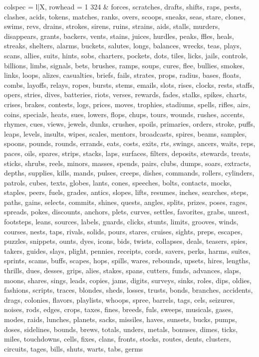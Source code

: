 \begin{tblr}[
  long,
  caption = {Examples from SNLI.},
  entry = {Short Caption},
  label = {tblr:test},
]{
colspec = {l|X},
rowhead = 1}
324 & forces, scratches, drafts, shifts, raps, pests, clashes, acids, tokens, matches, ranks, overs, scoops, sneaks, seas, stare, clones, swims, revs, drains, strokes, sirens, ruins, strains, aids, stalls, murders, disappears, grants, backers, vents, stains, juices, hurdles, peaks, ffles, heals, streaks, shelters, alarms, buckets, salutes, longs, balances, wrecks, teas, plays, scans, allies, suits, hints, sobs, charters, pockets, dots, tiles, licks, jails, controls, billions, limbs, signals, bets, brushes, ramps, soups, cures, flee, bullies, smokes, links, loops, alizes, casualties, briefs, fails, strates, props, radius, bases, floats, combs, layoffs, relays, ropes, bursts, stems, emails, slots, rises, clocks, rests, staffs, opers, stries, dives, batteries, riots, verses, rewards, fades, stalks, spikes, charts, crises, brakes, contests, logs, prices, moves, trophies, stadiums, spells, rifles, airs, coins, specials, heats, sues, lowers, flops, chups, tours, wounds, rushes, accents, rhymes, cues, views, jewels, dunks, crushes, spoils, primaries, orders, stroke, puffs, leaps, levels, insults, wipes, scales, mentors, broadcasts, spires, beams, samples, spoons, pounds, rounds, errands, eats, costs, exits, rts, swings, ancers, waits, reps, paces, oils, spares, strips, stacks, laps, surfaces, filters, deposits, stewards, treats, sticks, shrubs, reels, minors, masses, spends, pairs, clubs, dumps, soars, extracts, depths, supplies, kills, mands, pulses, creeps, dishes, commands, rollers, cylinders, patrols, cubes, texts, globes, lants, cones, speeches, bolts, contacts, mocks, staples, peers, fuels, grades, antics, slopes, lifts, resumes, inches, searches, steps, paths, gains, selects, commits, shines, quests, angles, splits, prizes, poses, rages, spreads, pokes, discounts, anchors, plets, curves, settles, favorites, grabs, unrest, footsteps, leans, sources, labels, guards, clicks, stunts, limits, grooves, winds, courses, nests, taps, rivals, solids, pours, stares, cruises, sights, preps, escapes, puzzles, snippets, ounts, dyes, icons, bids, twists, collapses, deals, teasers, spies, takers, guides, slays, plight, pennies, receipts, cords, savers, perks, harms, suites, sprints, scams, buffs, scapes, hops, spills, wares, rebounds, upsets, hires, lengths, thrills, dues, desses, grips, alies, stakes, spans, cutters, funds, advances, slaps, moons, shares, sings, leads, copies, jams, digits, surveys, sinks, roles, dips, oldies, fashions, scripts, traces, blondes, sheds, losses, trusts, bonds, branches, accidents, drags, colonies, flavors, playlists, whoops, spree, barrels, tags, cels, seizures, noises, rods, edges, crops, taxes, fines, breeds, fuls, sweeps, musicals, gases, modes, raids, lunches, planets, sacks, missiles, haves, sunsets, bucks, pumps, doses, sidelines, bounds, brews, totals, unders, metals, bonuses, dimes, ticks, miles, touchdowns, cells, fixes, clans, fronts, stocks, routes, dents, clusters, circuits, tages, bills, shuts, warts, tabs, germs \\\midrule

\end{tblr}
